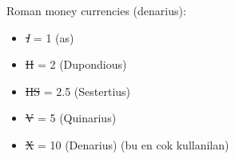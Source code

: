 \documentclass{ximera}
\begin{document}
Roman money currencies (denarius):
\begin{itemize}
    \item \sout{\textit{I}} = 1 (as)
    \item \sout{II} = 2 (Dupondious)
    \item \sout{IIS} = 2.5 (Sestertius)
    \item \sout{V} = 5 (Quinarius)
    \item \sout{X} = 10 (Denarius) (bu en cok kullanilan)
\end{itemize}


\end{document}
